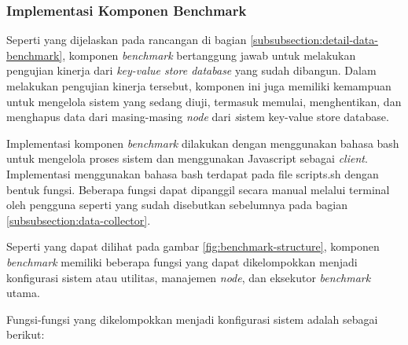 \subsubsection{Implementasi Komponen Benchmark}
\label{subsubsection:implementasi-benchmark}

Seperti yang dijelaskan pada rancangan di bagian \ref{subsubsection:detail-data-benchmark}, komponen \textit{benchmark} bertanggung jawab untuk melakukan pengujian kinerja dari \textit{key-value store database} yang sudah dibangun. Dalam melakukan pengujian kinerja tersebut, komponen ini juga memiliki kemampuan untuk mengelola sistem yang sedang diuji, termasuk memulai, menghentikan, dan menghapus data dari masing-masing \textit{node} dari \textit sistem {key-value store database}.

Implementasi komponen \textit{benchmark} dilakukan dengan menggunakan bahasa bash untuk mengelola proses sistem dan menggunakan Javascript sebagai \textit{client}. Implementasi menggunakan bahasa bash terdapat pada file scripts.sh dengan bentuk fungsi. Beberapa fungsi dapat dipanggil secara manual melalui terminal oleh pengguna seperti yang sudah disebutkan sebelumnya pada bagian \ref{subsubsection:data-collector}.

Seperti yang dapat dilihat pada gambar \ref{fig:benchmark-structure}, komponen \textit{benchmark} memiliki beberapa fungsi yang dapat dikelompokkan menjadi konfigurasi sistem atau utilitas, manajemen \textit{node}, dan eksekutor \textit{benchmark} utama.

Fungsi-fungsi yang dikelompokkan menjadi konfigurasi sistem adalah sebagai berikut:

